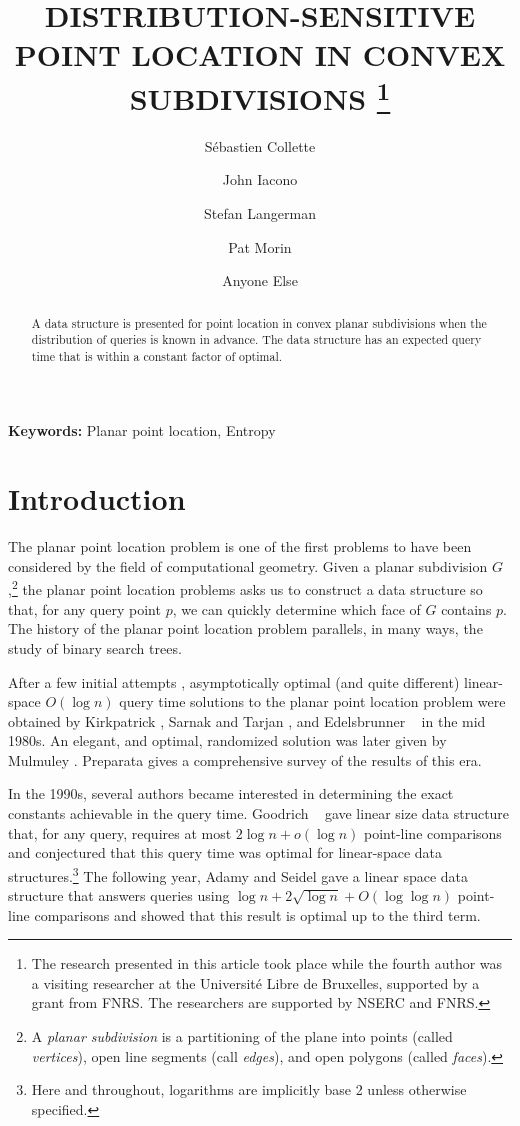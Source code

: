 \documentclass[charterfonts,lotsofwhite]{patmorin}
\title{\MakeUppercase{Distribution-Sensitive Point 
	Location in Convex Subdivisions}%
	\thanks{The research presented in this article took place
while the fourth author was a visiting researcher at the Universit\'e Libre de
Bruxelles, supported by a grant from FNRS.  The researchers are
supported by NSERC and FNRS.}}
\author{S\'ebastien Collette 
  \and John Iacono 
  \and Stefan Langerman 
  \and Pat Morin
  \and Anyone Else}
\date{}
\begin{document}
\maketitle

\begin{abstract}
A data structure is presented for point location in convex planar
subdivisions when the distribution of queries is known in advance.
The data structure has an expected query time that is within a
constant factor of optimal.
\end{abstract}

\noindent\textbf{Keywords:}
Planar point location, Entropy

\section{Introduction}

The planar point location problem is one of the first problems to have
been considered by the field of computational geometry. Given a planar
subdivision $G$,\footnote{A \emph{planar subdivision} is a
partitioning of the plane into points (called \emph{vertices}), open
line segments (call \emph{edges}), and open polygons (called
\emph{faces}).} the planar point location problems asks us to
construct a data structure so that, for any query point $p$, we can
quickly determine which face of $G$ contains $p$.  The history of the
planar point location problem parallels, in many ways, the study of
binary search trees.

After a few initial attempts \cite{dl76,lp77,p81}, asymptotically
optimal (and quite different) linear-space $O(\log n)$ query time
solutions to the planar point location problem were obtained by
Kirkpatrick \cite{k83}, Sarnak and Tarjan \cite{st86}, and Edelsbrunner
\etal\ \cite{egs86} in the mid 1980s.  An elegant, and optimal,
randomized solution was later given by Mulmuley \cite{m90}.  Preparata
\cite{p90} gives a comprehensive survey of the results of this era.

In the 1990s, several authors became interested in determining the
exact constants achievable in the query time.  Goodrich \etal\
\cite{gor97} gave linear size data structure that, for any query,
requires at most $2\log n + o(\log n)$ point-line comparisons and
conjectured that this query time was optimal for linear-space data
structures.\footnote{Here and throughout, logarithms are implicitly
base 2 unless otherwise specified.} The following year, Adamy
and Seidel \cite{as98} gave a linear space data structure that answers
queries using $\log n + 2\sqrt{\log n} + O(\log\log n)$ point-line
comparisons and showed that this result is optimal up to the third
term.
\end{document}
